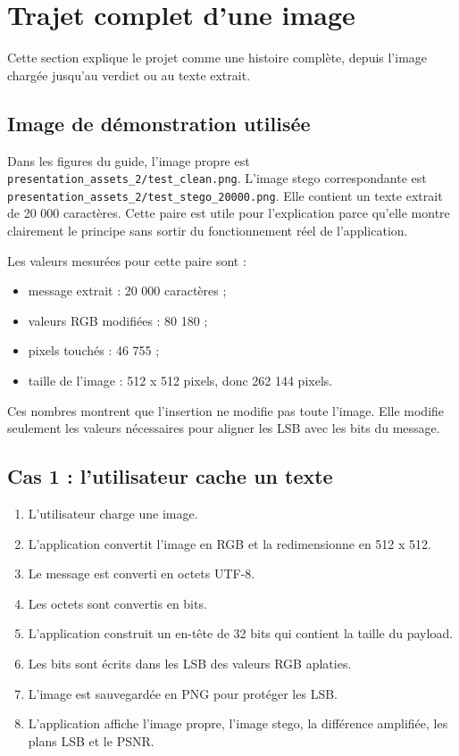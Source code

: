 \documentclass[11pt,a4paper]{article}
\begin{document}
\section{Trajet complet d'une image}
Cette section explique le projet comme une histoire complète, depuis l'image chargée jusqu'au verdict ou au texte extrait.

\subsection*{Image de démonstration utilisée}
Dans les figures du guide, l'image propre est \texttt{presentation\_assets\_2/test\_clean.png}. L'image stego correspondante est \texttt{presentation\_assets\_2/test\_stego\_20000.png}. Elle contient un texte extrait de 20 000 caractères. Cette paire est utile pour l'explication parce qu'elle montre clairement le principe sans sortir du fonctionnement réel de l'application.

Les valeurs mesurées pour cette paire sont :
\begin{itemize}
  \item message extrait : 20 000 caractères ;
  \item valeurs RGB modifiées : 80 180 ;
  \item pixels touchés : 46 755 ;
  \item taille de l'image : 512 x 512 pixels, donc 262 144 pixels.
\end{itemize}

Ces nombres montrent que l'insertion ne modifie pas toute l'image. Elle modifie seulement les valeurs nécessaires pour aligner les LSB avec les bits du message.

\subsection*{Cas 1 : l'utilisateur cache un texte}
\begin{enumerate}
  \item L'utilisateur charge une image.
  \item L'application convertit l'image en RGB et la redimensionne en 512 x 512.
  \item Le message est converti en octets UTF-8.
  \item Les octets sont convertis en bits.
  \item L'application construit un en-tête de 32 bits qui contient la taille du payload.
  \item Les bits sont écrits dans les LSB des valeurs RGB aplaties.
  \item L'image est sauvegardée en PNG pour protéger les LSB.
  \item L'application affiche l'image propre, l'image stego, la différence amplifiée, les plans LSB et le PSNR.
\end{enumerate}
\end{document}
